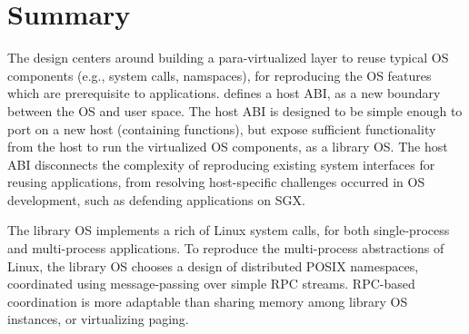 \section{Summary}
\label{sec:graphene:summary}

The \graphene{} design centers around
building a para-virtualized layer to reuse typical OS components (e.g., system calls, namspaces), for reproducing the OS features which are prerequisite to applications.
\graphene{} defines a host ABI, as a new boundary between the OS and user space.
The host ABI is designed to be simple enough to port on a new host (containing \palcalls{} functions),
but expose sufficient functionality from the host to run the virtualized OS components, as a library OS.
The host ABI disconnects the complexity of reproducing existing system interfaces for reusing applications,
from resolving host-specific challenges occurred in OS development,
such as defending applications on SGX.


The \graphene{} library OS implements a rich of Linux system calls, for both single-process and multi-process applications.
To reproduce the multi-process abstractions of Linux,
the library OS chooses a design of distributed POSIX namespaces,
coordinated using message-passing over simple RPC streams.
RPC-based coordination is more adaptable than sharing memory among library OS instances, or virtualizing paging.








